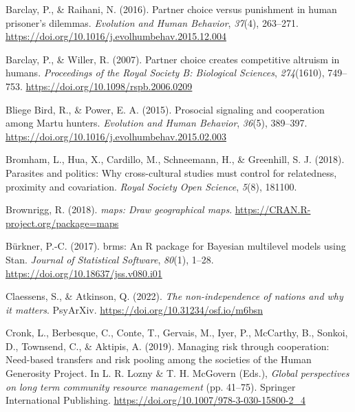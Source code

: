 \documentclass[
  man,floatsintext]{apa6}
\newlength{\cslhangindent}
\newlength{\cslentryspacingunit} %
\newenvironment{CSLReferences}[2] %
 {%
  \setlength{\parindent}{0pt}
  \ifodd #1
  \let\oldpar\par
  \def\par{\hangindent=\cslhangindent\oldpar}
  \fi
  \setlength{\parskip}{#2\cslentryspacingunit}
 }%
 {}
\begin{document}
\begin{CSLReferences}{1}{0}
\leavevmode{}%
Barclay, P., \& Raihani, N. (2016). Partner choice versus punishment in human prisoner's dilemmas. \emph{Evolution and Human Behavior}, \emph{37}(4), 263--271. \url{https://doi.org/10.1016/j.evolhumbehav.2015.12.004}

\leavevmode{}%
Barclay, P., \& Willer, R. (2007). Partner choice creates competitive altruism in humans. \emph{Proceedings of the Royal Society B: Biological Sciences}, \emph{274}(1610), 749--753. \url{https://doi.org/10.1098/rspb.2006.0209}

\leavevmode{}%
Bliege Bird, R., \& Power, E. A. (2015). Prosocial signaling and cooperation among {Martu} hunters. \emph{Evolution and Human Behavior}, \emph{36}(5), 389--397. \url{https://doi.org/10.1016/j.evolhumbehav.2015.02.003}

\leavevmode{}%
Bromham, L., Hua, X., Cardillo, M., Schneemann, H., \& Greenhill, S. J. (2018). Parasites and politics: Why cross-cultural studies must control for relatedness, proximity and covariation. \emph{Royal Society Open Science}, \emph{5}(8), 181100.

\leavevmode{}%
Brownrigg, R. (2018). \emph{{m}aps: Draw geographical maps}. \url{https://CRAN.R-project.org/package=maps}

\leavevmode{}%
Bürkner, P.-C. (2017). {brms}: An {R} package for {Bayesian} multilevel models using {Stan}. \emph{Journal of Statistical Software}, \emph{80}(1), 1--28. \url{https://doi.org/10.18637/jss.v080.i01}

\leavevmode{}%
Claessens, S., \& Atkinson, Q. (2022). \emph{The non-independence of nations and why it matters}. PsyArXiv. \url{https://doi.org/10.31234/osf.io/m6bsn}

\leavevmode{}%
Cronk, L., Berbesque, C., Conte, T., Gervais, M., Iyer, P., McCarthy, B., Sonkoi, D., Townsend, C., \& Aktipis, A. (2019). Managing risk through cooperation: Need-based transfers and risk pooling among the societies of the {Human Generosity Project}. In L. R. Lozny \& T. H. McGovern (Eds.), \emph{Global perspectives on long term community resource management} (pp. 41--75). Springer International Publishing. \url{https://doi.org/10.1007/978-3-030-15800-2_4}


\end{CSLReferences}
\end{document}

